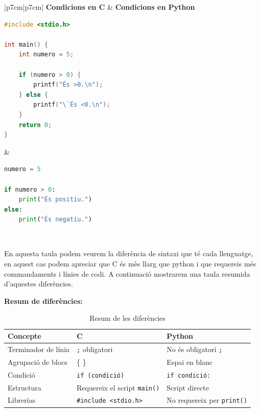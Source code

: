 \begin{table}[h!]
\centering
\begin{tabular}{|p{7cm}|p{7cm}|}
\hline
\textbf{Condicions en C} & \textbf{Condicions en Python} \\ \hline

\begin{minipage}[t]{\linewidth}
\begin{lstlisting}[language=C]
#include <stdio.h>

int main() {
    int numero = 5;

    if (numero > 0) {
        printf("És >0.\n");
    } else {
        printf("\`És <0.\n");
    }
    return 0;
}
\end{lstlisting}
\end{minipage}
&
\begin{minipage}[t]{\linewidth}
\begin{lstlisting}[language=Python]
numero = 5

if numero > 0:
    print("És positiu.")
else:
    print("És negatiu.")
\end{lstlisting}
\end{minipage}
\\ \hline
\end{tabular}
\caption{Comparació de condicions en C i Python}
\end{table}

En aquesta taula podem veurem la diferència de sintaxi que té cada llenguatge, en aquest cas podem apreciar que C és mès llarg que python i que requereis més commandaments i línies de codi. A continuació mostrarem una taula resumida d'aquestes diferències.

\textbf{Resum de diferències:}
\begin{table}[h!]
\centering
\begin{tabular}{|l|l|l|}
\hline
\textbf{Concepte} & \textbf{C} & \textbf{Python} \\
\hline
Terminador de línia & \verb|;| obligatori & No és obligatori \verb|;| \\
\hline
Agrupació de blocs & \{ \} & Espai en blanc \\
\hline
Condició & \verb|if (condició)| & \verb|if condició:| \\
\hline
Estructura & Requereix el script \verb|main()| & Script directe \\
\hline
Librerías & \verb|#include <stdio.h>| & No requereix per \verb|print()| \\
\hline
\end{tabular}
\caption{Resum de les diferències}
\end{table}












